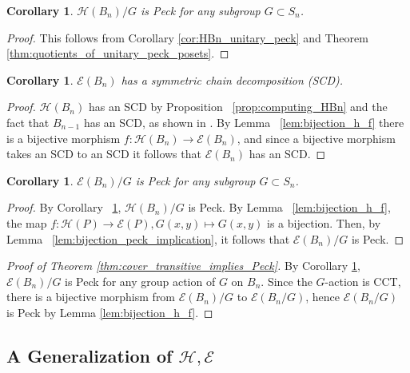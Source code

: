 \documentclass[10 pt]{amsart}
\theoremstyle{plain}
\newtheorem{cor}[thm]{Corollary}
\theoremstyle{definition}
\theoremstyle{remark}
\numberwithin{equation}{section}
\begin{document}
\begin{cor}\label{cor:quotients_of_HBn_peck}
$\mathcal H(B_n)/G$ is Peck for any subgroup $G\subset S_n$.
\end{cor}

\begin{proof}
This follows from Corollary \ref{cor:HBn_unitary_peck} and Theorem \ref{thm:quotients_of_unitary_peck_posets}.
\end{proof}

\begin{cor}
$\mathcal{E}(B_n)$ has a symmetric chain decomposition (SCD).
\end{cor}

\begin{proof}
$\mathcal{H}(B_n)$ has an SCD by Proposition ~\ref{prop:computing_HBn} and the fact that $B_{n-1}$ has an SCD, as shown in \cite{greene}.  By Lemma ~\ref{lem:bijection_h_f} there is a bijective morphism $f\colon\mathcal{H}(B_n)\rightarrow\mathcal{E}(B_n)$, and since a bijective morphism takes an SCD to an SCD it follows that $\mathcal{E}(B_n)$ has an SCD.
\end{proof}


\begin{cor}
\label{cor:quotiented_edge_peck}
$\mathcal E(B_n)/G$ is Peck for any subgroup $G\subset S_n$.
\end{cor}
\begin{proof}
By Corollary ~\ref{cor:quotients_of_HBn_peck}, $\mathcal H(B_n)/G$ is Peck. By Lemma ~\ref{lem:bijection_h_f}, the map $f:\mathcal H(P) \rightarrow \mathcal E(P),G(x, y) \mapsto G(x, y)$ is a bijection. Then, by Lemma ~\ref{lem:bijection_peck_implication}, it follows that $\mathcal E(B_n)/G$ is Peck.
\end{proof}

\begin{proof}[Proof of Theorem \ref{thm:cover_transitive_implies_Peck}]
By Corollary \ref{cor:quotiented_edge_peck}, $\mathcal{E}(B_n)/G$ is Peck for any group action of $G$ on $B_n.$ Since the $G$-action is CCT, there is a bijective morphism from $\mathcal{E}(B_n)/G$ to $\mathcal{E}(B_n/G)$, hence $\mathcal{E}(B_n/G)$ is Peck by Lemma \ref{lem:bijection_h_f}.
\end{proof}


\subsection{A Generalization of $\mathcal H,\mathcal E$}\label{ssec:E_generalization}
\end{document}
